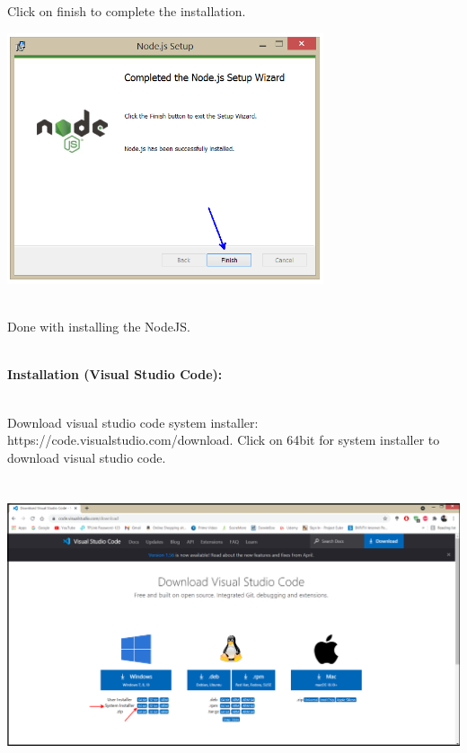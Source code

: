 \documentclass{article}
\begin{document}
\noindent Click on finish to complete the installation.
 

\begin{center}
	\noindent \includegraphics*[width=3.67in, height=2.91in]{IMG-06-15}
\end{center}

\noindent \\
Done with installing the NodeJS.

\noindent \\
\newpage
\noindent \textbf{Installation (Visual Studio Code):}

 
  
\noindent \\
Download visual studio code system installer: https://code.visualstudio.com/download. Click on 64bit for system installer to download visual studio code.
 

\begin{center}
	\noindent \includegraphics*[width=6.21in, height=3.37in]{IMG-06-16}
\end{center}
\end{document}
